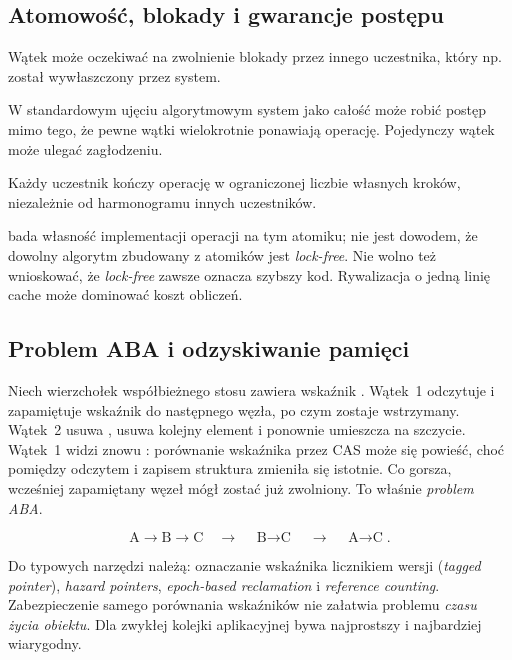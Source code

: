 \subsection{Atomowość, blokady i gwarancje postępu}

\begin{description}[style=nextline]
\item[\emph{Blocking}] Wątek może oczekiwać na zwolnienie blokady przez
innego uczestnika, który np. został wywłaszczony przez system.
\item[\emph{Lock-free}] W standardowym ujęciu algorytmowym system jako
całość może robić postęp mimo tego, że pewne wątki wielokrotnie ponawiają
operację. Pojedynczy wątek może ulegać zagłodzeniu.
\item[\emph{Wait-free}] Każdy uczestnik kończy operację w ograniczonej
liczbie własnych kroków, niezależnie od harmonogramu innych uczestników.
\end{description}

 bada własność implementacji operacji
na tym atomiku; nie jest dowodem, że dowolny algorytm zbudowany z
atomików jest \emph{lock-free}. Nie wolno też wnioskować, że
\emph{lock-free} zawsze oznacza szybszy kod. Rywalizacja o jedną
linię cache może dominować koszt obliczeń.

\subsection{Problem ABA i odzyskiwanie pamięci}

Niech wierzchołek współbieżnego stosu zawiera wskaźnik .
Wątek~1 odczytuje  i zapamiętuje wskaźnik do następnego
węzła, po czym zostaje wstrzymany. Wątek~2 usuwa , usuwa
kolejny element  i ponownie umieszcza  na szczycie.
Wątek~1 widzi znowu : porównanie wskaźnika przez CAS może się
powieść, choć pomiędzy odczytem i zapisem struktura zmieniła się
istotnie. Co gorsza, wcześniej zapamiętany węzeł mógł zostać już
zwolniony. To właśnie \emph{problem ABA}.

\[
\boxed{\text{A}\to\text{B}\to\text{C}}
\quad\longrightarrow\quad
\boxed{\text{B}\to\text{C}}
\quad\longrightarrow\quad
\boxed{\text{A}\to\text{C}}.
\]

Do typowych narzędzi należą: oznaczanie wskaźnika licznikiem wersji
(\emph{tagged pointer}), \emph{hazard pointers}, \emph{epoch-based
reclamation} i \emph{reference counting}. Zabezpieczenie samego
porównania wskaźników nie załatwia problemu \emph{czasu życia obiektu}.
Dla zwykłej kolejki aplikacyjnej  bywa
najprostszy i najbardziej wiarygodny.

